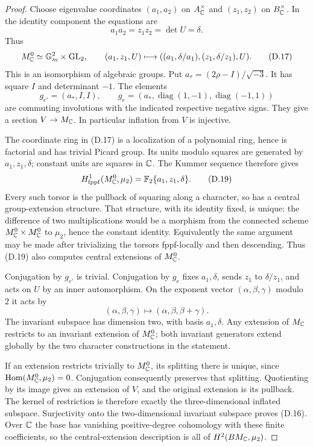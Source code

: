 \begin{proof}
Choose eigenvalue coordinates
\((a_1,a_2)\) on \(A_\mathbb C^\times\) and
\((z_1,z_2)\) on \(B_\mathbb C^\times\).  In the identity component
the equations are
\[
 a_1a_2=z_1z_2=\det U=\delta .
\]
Thus
\[
 M_\mathbb C^0\simeq\mathbb G_m^2\times\operatorname{GL}_2,\qquad
 (a_1,z_1,U)\longmapsto
 ((a_1,\delta/a_1),(z_1,\delta/z_1),U).
 \tag{D.17}
\]
This is an isomorphism of algebraic groups.
Put \(a_*=(2\rho-I)/\sqrt{-3}\).  It has square \(I\)
and determinant \(-1\).  The elements
\[
 g_{e'}=(a_*,I,I),\qquad
 g_e=(a_*,\operatorname{diag}(1,-1),
                  \operatorname{diag}(-1,1))
 \tag{D.18}
\]
are commuting involutions with the indicated respective
negative signs.  They give a section \(V\to M_\mathbb C\).
In particular inflation from \(V\) is injective.

The coordinate ring in (D.17) is a localization of a polynomial
ring, hence is factorial and has trivial Picard group.  Its
units modulo squares are generated by \(a_1,z_1,\delta\);
constant units are squares in \(\mathbb C\).
The Kummer sequence therefore gives
\[
 H^1_{\mathrm{fppf}}(M_\mathbb C^0,\mu _2)
   =\mathbb F_2\{a_1,z_1,\delta\}.                                  \tag{D.19}
\]
Every such torsor is the pullback of squaring along a character,
so has a central group-extension structure.  That structure,
with its identity fixed, is unique: the difference of two
multiplications would be a morphism from the connected scheme
\(M_\mathbb C^0\times M_\mathbb C^0\) to \(\mu _2\), hence the constant
identity.  Equivalently the same argument may be made after
trivializing the torsors fppf-locally and then descending.
Thus (D.19) also computes central extensions of \(M_\mathbb C^0\).

Conjugation by \(g_{e'}\) is trivial.  Conjugation by \(g_e\)
fixes \(a_1,\delta\), sends \(z_1\) to \(\delta/z_1\), and
acts on \(U\) by an inner automorphism.  On the exponent
vector \((\alpha,\beta,\gamma)\) modulo \(2\) it acts by
\[
       (\alpha,\beta,\gamma)\longmapsto
       (\alpha,\beta,\beta+\gamma).
 \tag{D.20}
\]
The invariant subspace has dimension two, with basis
\(a_1,\delta\).  Any extension of \(M_\mathbb C\) restricts to an
invariant extension of \(M_\mathbb C^0\); both invariant generators
extend globally by the two character constructions in the
statement.

If an extension restricts trivially to \(M_\mathbb C^0\), its splitting
there is unique, since
\(\operatorname{Hom}(M_\mathbb C^0,\mu _2)=0\).  Conjugation consequently preserves
that splitting.  Quotienting by its image gives an extension
of \(V\), and the original extension is its pullback.
The kernel of restriction is therefore exactly the
three-dimensional inflated subspace.  Surjectivity onto the
two-dimensional invariant subspace proves (D.16).
Over \(\mathbb C\) the base has vanishing positive-degree cohomology
with these finite coefficients, so the central-extension
description is all of \(H^2(BM_\mathbb C,\mu _2)\).


\end{proof}
